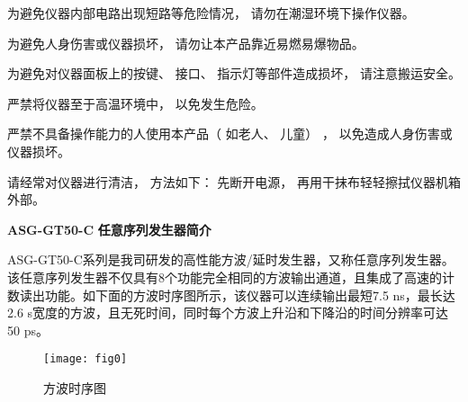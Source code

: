 \vspace{0.6cm}

为避免仪器内部电路出现短路等危险情况， 请勿在潮湿环境下操作仪器。


\vspace{0.6cm}

为避免人身伤害或仪器损坏， 请勿让本产品靠近易燃易爆物品。

\vspace{0.6cm}

为避免对仪器面板上的按键、 接口、 指示灯等部件造成损坏， 请注意搬运安全。

\newpage

严禁将仪器至于高温环境中， 以免发生危险。

\vspace{0.5cm}

严禁不具备操作能力的人使用本产品（ 如老人、 儿童） ， 以免造成人身伤害或仪器损坏。

\vspace{0.5cm}

请经常对仪器进行清洁， 方法如下： 先断开电源， 再用干抹布轻轻擦拭仪器机箱外部。

\newpage
\noindent\huge \textbf{ASG-GT50-C} \xiaoer\textbf{任意序列发生器简介}
\vspace{0.6cm}

 \normalsize ASG-GT50-C\song 系列是我司研发的高性能方波/延时发生器，又称任意序列发生器。该任意序列发生器不仅具有8个功能完全相同的方波输出通道，且集成了高速的计数读出功能。如下面的方波时序图所示，该仪器可以连续输出最短7.5 ns，最长达2.6 s宽度的方波，且无死时间，同时每个方波上升沿和下降沿的时间分辨率可达50 ps。
\begin{figure}[ht]
\centering
\texttt{[image: fig0]}
\caption{方波时序图}\label{fig:fig1}
\end{figure}
\vspace{0.7cm}

